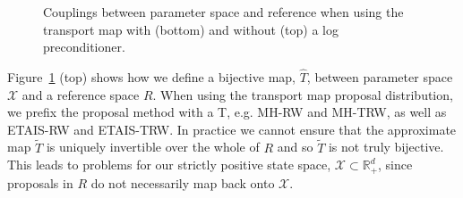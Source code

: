 \documentclass[final]{siamltex}
\newcommand\irregularcircle[2]{%
  \pgfextra {\pgfmathsetmacro\len{(#1)+rand*(#2)}}
  +(0:\len pt)
  \foreach \a in {10,20,...,350}{
    \pgfextra {\pgfmathsetmacro\len{(#1)+rand*(#2)}}
    -- +(\a:\len pt)
  } -- cycle
}
\begin{document}
\begin{figure}
	\centering

	\caption{Couplings between parameter space and reference
          when using the transport map with (bottom) and without (top)
        a log preconditioner.}
	\label{fig:chem_coupling}
\end{figure}

Figure~\ref{fig:chem_coupling} (top) shows how we define a bijective map,
$\hat{T}$, between parameter space $\mathcal{X}$ and a reference space
$R$. When using the transport map proposal distribution, we prefix the proposal method with a T, e.g. MH-RW  and MH-TRW, as well as ETAIS-RW and ETAIS-TRW. In practice we cannot ensure that the approximate map $\tilde{T}$
is uniquely invertible over the whole of $R$ and so $\tilde{T}$ is not
truly bijective. This leads to problems for our strictly positive
state space, $\mathcal{X} \subset \mathbb{R}_+^d$, since proposals in
$R$ do not necessarily map back onto $\mathcal{X}$.
\end{document}
